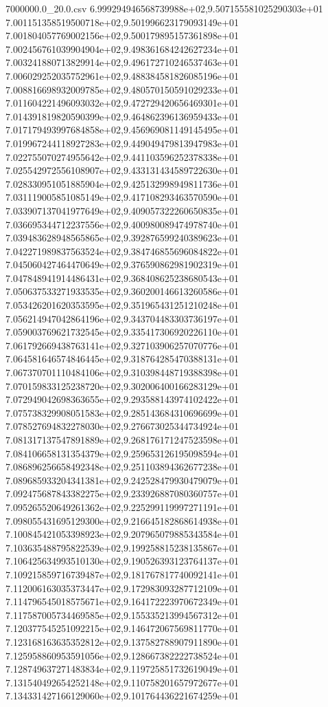 \begin{filecontents*}{7000000.0_20.0.csv}
6.999294946568739988e+02,9.507155581025290303e+01
7.001151358519500718e+02,9.501996623179093149e+01
7.001804057769002156e+02,9.500179895157361898e+01
7.002456761039904904e+02,9.498361684242627234e+01
7.003241880713829914e+02,9.496172710246537463e+01
7.006029252035752961e+02,9.488384581826085196e+01
7.008816698932009785e+02,9.480570150591029233e+01
7.011604221496093032e+02,9.472729420656469301e+01
7.014391819820590399e+02,9.464862396136959433e+01
7.017179493997684858e+02,9.456969081149145495e+01
7.019967244118927283e+02,9.449049479813947983e+01
7.022755070274955642e+02,9.441103596252378338e+01
7.025542972556108907e+02,9.433131434589722630e+01
7.028330951051885904e+02,9.425132998949811736e+01
7.031119005851085149e+02,9.417108293463570590e+01
7.033907137041977649e+02,9.409057322260650835e+01
7.036695344712237556e+02,9.400980089474978740e+01
7.039483628948565865e+02,9.392876599240389623e+01
7.042271989837563524e+02,9.384746855696084822e+01
7.045060427464470649e+02,9.376590862981902319e+01
7.047848941914486431e+02,9.368408625238680543e+01
7.050637533271933535e+02,9.360200146613260586e+01
7.053426201620353595e+02,9.351965431251210248e+01
7.056214947042864196e+02,9.343704483303736197e+01
7.059003769621732545e+02,9.335417306920226110e+01
7.061792669438763141e+02,9.327103906257070776e+01
7.064581646574846445e+02,9.318764285470388131e+01
7.067370701110484106e+02,9.310398448719388398e+01
7.070159833125238720e+02,9.302006400166283129e+01
7.072949042698363655e+02,9.293588143974102422e+01
7.075738329908051583e+02,9.285143684310696699e+01
7.078527694832278030e+02,9.276673025344734924e+01
7.081317137547891889e+02,9.268176171247523598e+01
7.084106658131354379e+02,9.259653126195098594e+01
7.086896256658492348e+02,9.251103894362677238e+01
7.089685933204341381e+02,9.242528479930479079e+01
7.092475687843382275e+02,9.233926887080360757e+01
7.095265520649261362e+02,9.225299119997271191e+01
7.098055431695129300e+02,9.216645182868614938e+01
7.100845421053398923e+02,9.207965079885343584e+01
7.103635488795822539e+02,9.199258815238135867e+01
7.106425634993510130e+02,9.190526393123764137e+01
7.109215859716739487e+02,9.181767817740092141e+01
7.112006163035373447e+02,9.172983093287712109e+01
7.114796545018575671e+02,9.164172223970672349e+01
7.117587005734469585e+02,9.155335213994567312e+01
7.120377545251092215e+02,9.146472067569811770e+01
7.123168163635352812e+02,9.137582788907911890e+01
7.125958860953591056e+02,9.128667382222738524e+01
7.128749637271483834e+02,9.119725851732619049e+01
7.131540492654252148e+02,9.110758201657972677e+01
7.134331427166129060e+02,9.101764436221674259e+01

\end{filecontents*}
